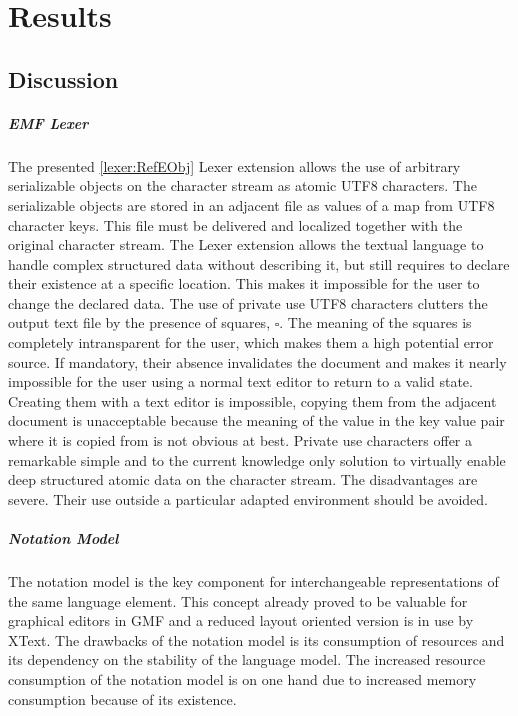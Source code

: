 \chapter{Results}

\section{Discussion}

%
\paragraph{EMF Lexer} The presented \ref{lexer:RefEObj} Lexer extension allows the use of arbitrary serializable objects on the character stream as atomic UTF8 characters. The serializable objects are stored in an adjacent file as values of a map from UTF8 character keys. This file must be delivered and localized together with the original character stream. The Lexer extension allows the textual language to handle complex structured data without describing it, but still requires to declare their existence at a specific location. This makes it impossible for the user to change the declared data. The use of private use UTF8 characters clutters the output text file by the presence of squares, $\square$. The meaning of the squares is completely intransparent for the user, which makes them a high potential error source. If mandatory, their absence invalidates the document and makes it nearly impossible for the user using a normal text editor to return to a valid state. Creating them with a text editor is impossible, copying them from the adjacent document is unacceptable because the meaning of the value in the key value pair where it is copied from is not obvious at best. Private use characters offer a remarkable simple and to the current knowledge only solution to virtually enable deep structured atomic data on the character stream. The disadvantages are severe. Their use outside a particular adapted environment should be avoided.  

\paragraph{Notation Model} The notation model is the key component for interchangeable representations of the same language element. This concept already proved to be valuable for graphical editors in GMF and a reduced layout oriented version is in use by XText. The drawbacks of the notation model is its consumption of resources and its dependency on the stability of the language model. The increased resource consumption of the notation model is on one hand due to increased memory consumption because of its existence. %



